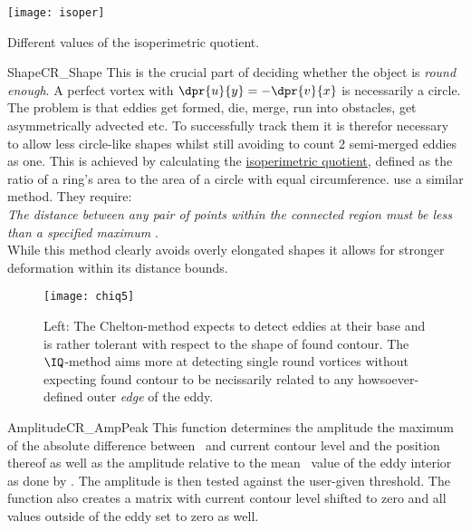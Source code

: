 \begin{marginfigure}
	\texttt{[image: isoper]}
	\caption{Different values of the isoperimetric quotient.}
	\label{fig:isoper}
\end{marginfigure}
\begin{filter}{Shape}{CR_Shape}
\label{filter:shape}
This is the crucial part of deciding whether the object is \textit{round
enough}. A perfect vortex with $\dpr{u}{y}=-\dpr{v}{x}$ is necessarily a
circle. The problem is that eddies get formed, die, merge, run into obstacles,
get asymmetrically advected etc. To successfully track them it is therefor
necessary to allow less circle-like shapes whilst still avoiding to \eg count 2
semi-merged eddies as one.
This is achieved by calculating the \hyperref[def:IQ]{isoperimetric quotient},
defined as the ratio of a ring's area to the area of a circle with equal
circumference. \citet{Chelton2011} use a similar method. They
require:\\ \textit{The distance between any pair of points within the connected
region must be less than a specified maximum} \citep{Chelton2011}.\\
While this method clearly avoids overly elongated shapes it allows for stronger
deformation within its distance bounds.
\end{filter}\newline
\begin{figure}
		\texttt{[image: chiq5]}
		\caption{Left: The Chelton-method expects to detect eddies at their base and is rather tolerant with respect to the shape of found contour. The $\IQ$-method aims more at detecting single round vortices without expecting found contour to be necissarily related to any howsoever-defined outer \textit{edge} of the eddy.}
		\label{fig:chiq5}
\end{figure}
\begin{filter}{Amplitude}{CR_AmpPeak}
\label{filter:amp}
This function determines the amplitude \ie the maximum of the absolute
difference between \SSH~and current contour level and the position thereof as
well as the amplitude relative to the mean \SSH~value of the eddy interior as
done by \citet{Chelton2011}. The
amplitude is then tested against the user-given threshold.
The function also creates a matrix with current contour level shifted to zero and all values outside of the eddy set to zero as well.
\end{filter}\newline
